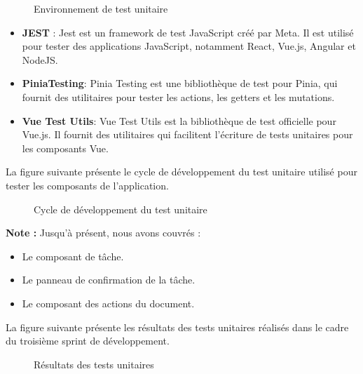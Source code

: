 \begin{figure}[H]
  \centering
  \caption{Environnement de test unitaire}
  \label{fig:environnementdetestunitaire}
\end{figure}
\begin{itemize}
  \item \textbf{JEST} : Jest est un framework de test JavaScript créé par Meta. Il est utilisé pour tester des applications JavaScript, notamment React, Vue.js, Angular et NodeJS.
  \item \textbf{PiniaTesting}: Pinia Testing est une bibliothèque de test pour Pinia, qui fournit des utilitaires pour tester les actions, les getters et les mutations.
  \item \textbf{Vue Test Utils}: Vue Test Utils est la bibliothèque de test officielle pour Vue.js. Il fournit des utilitaires qui facilitent l'écriture de tests unitaires pour les composants Vue.
\end{itemize}



La figure suivante présente le cycle de développement du test unitaire utilisé pour tester les composants de l'application.

\begin{figure}[H]
  \centering
  \caption{Cycle de développement du test unitaire}
  \label{fig:cyclededveloppementdutestunitaire}
\end{figure}


\textbf{Note : } Jusqu'à présent, nous avons couvrés :
\begin{itemize}
  \item Le composant de tâche.
  \item Le panneau de confirmation de la tâche.
  \item Le composant des actions du document.
\end{itemize}


La figure suivante présente les résultats des tests unitaires réalisés dans le cadre du troisième sprint de développement.

\begin{figure}[H]
  \centering
  \caption{Résultats des tests unitaires}
  \label{fig:resultatstestunitaire}
\end{figure}

